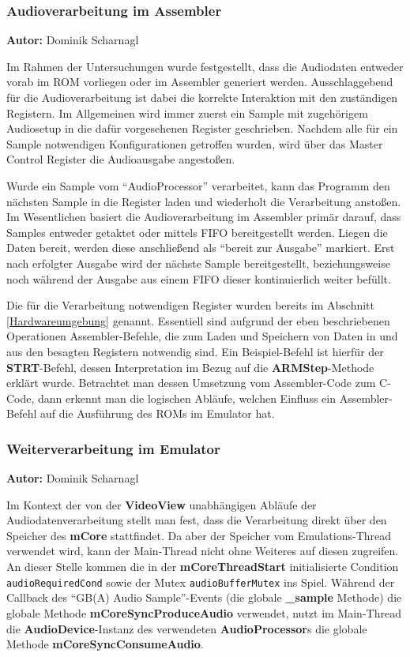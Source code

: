 \documentclass[11pt,a4paper]{scrartcl}
\newcommand{\AutorDominik} {
    \vspace{-4mm}
    \large \textbf{Autor:} Dominik Scharnagl \normalsize
    \vspace{2mm}
}
\begin{document}

\subsubsection{Audioverarbeitung im Assembler}
\AutorDominik

Im Rahmen der Untersuchungen wurde festgestellt, dass die Audiodaten entweder vorab im ROM vorliegen oder im Assembler generiert werden. Ausschlaggebend f\"ur die Audioverarbeitung ist dabei die korrekte Interaktion mit den zust\"andigen Registern. Im Allgemeinen wird immer zuerst ein Sample mit zugeh\"origem Audiosetup in die daf\"ur vorgesehenen Register geschrieben. Nachdem alle f\"ur ein Sample notwendigen Konfigurationen getroffen wurden, wird \"uber das Master Control Register die Audioausgabe angesto{\ss}en.

Wurde ein Sample vom \enquote{AudioProcessor} verarbeitet, kann das Programm den n\"achsten Sample in die Register laden und wiederholt die Verarbeitung ansto{\ss}en. Im Wesentlichen basiert die Audioverarbeitung im Assembler prim\"ar darauf, dass Samples entweder getaktet oder mittels FIFO bereitgestellt werden. Liegen die Daten bereit, werden diese anschlie{\ss}end als \enquote{bereit zur Ausgabe} markiert. Erst nach erfolgter Ausgabe wird der n\"achste Sample bereitgestellt, beziehungsweise noch w\"ahrend der Ausgabe aus einem FIFO dieser kontinuierlich weiter bef\"ullt.

Die f\"ur die Verarbeitung notwendigen Register wurden bereits im Abschnitt \ref{Hardwareumgebung} genannt. Essentiell sind aufgrund der eben beschriebenen Operationen Assembler-Befehle, die zum Laden und Speichern von Daten in und aus den besagten Registern notwendig sind. Ein Beispiel-Befehl ist hierf\"ur der \textbf{STRT}-Befehl, dessen Interpretation im Bezug auf die \textbf{ARMStep}-Methode erkl\"art wurde. Betrachtet man dessen Umsetzung vom Assembler-Code zum C-Code, dann erkennt man die logischen Abl\"aufe, welchen Einfluss ein Assembler-Befehl auf die Ausf\"uhrung des ROMs im Emulator hat.



\subsubsection{Weiterverarbeitung im Emulator}
\AutorDominik

Im Kontext der von der \textbf{VideoView} unabh\"angigen Abl\"aufe der Audiodatenverarbeitung stellt man fest, dass die Verarbeitung direkt \"uber den Speicher des \textbf{mCore} stattfindet. Da aber der Speicher vom Emulations-Thread verwendet wird, kann der Main-Thread nicht ohne Weiteres auf diesen zugreifen. An dieser Stelle kommen die in der \textbf{mCoreThreadStart} initialisierte Condition \verb|audioRequiredCond| sowie der Mutex \verb|audioBufferMutex| ins Spiel. W\"ahrend der Callback des \enquote{GB(A) Audio Sample}-Events (die globale \textbf{{\_}sample} Methode) die globale Methode \textbf{mCoreSyncProduceAudio} verwendet, nutzt im Main-Thread die \textbf{AudioDevice}-Instanz des verwendeten \textbf{AudioProcessor}s die globale Methode \textbf{mCoreSyncConsumeAudio}.
\end{document}
